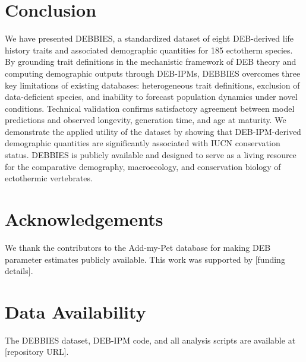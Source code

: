 \documentclass[11pt]{article}
\begin{document}
\section{Conclusion}

We have presented DEBBIES, a standardized dataset of eight DEB-derived life history traits and associated demographic quantities for 185 ectotherm species. By grounding trait definitions in the mechanistic framework of DEB theory and computing demographic outputs through DEB-IPMs, DEBBIES overcomes three key limitations of existing databases: heterogeneous trait definitions, exclusion of data-deficient species, and inability to forecast population dynamics under novel conditions. Technical validation confirms satisfactory agreement between model predictions and observed longevity, generation time, and age at maturity. We demonstrate the applied utility of the dataset by showing that DEB-IPM-derived demographic quantities are significantly associated with IUCN conservation status. DEBBIES is publicly available and designed to serve as a living resource for the comparative demography, macroecology, and conservation biology of ectothermic vertebrates.

\section*{Acknowledgements}

We thank the contributors to the Add-my-Pet database for making DEB parameter estimates publicly available. This work was supported by [funding details].

\section*{Data Availability}

The DEBBIES dataset, DEB-IPM code, and all analysis scripts are available at [repository URL].



\end{document}
